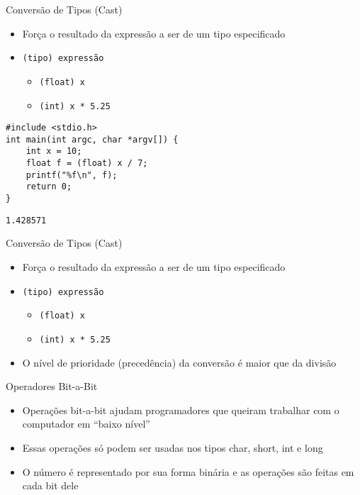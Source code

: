 \documentclass[t, aspectratio=169]{beamer}
\begin{document}
\begin{frame}[label={sec:org2662217},fragile]{Conversão de Tipos (Cast)}
 \begin{itemize}
\item Força o resultado da expressão a ser de um tipo especificado
\item \texttt{(tipo) expressão}
\begin{itemize}
\item \texttt{(float) x}
\item \texttt{(int) x * 5.25}
\end{itemize}
\end{itemize}

\vspace{-0.25cm}
\begin{verbatim}
#include <stdio.h>
int main(int argc, char *argv[]) {
    int x = 10;
    float f = (float) x / 7;
    printf("%f\n", f);
    return 0;
}
\end{verbatim}

\begin{verbatim}
1.428571
\end{verbatim}
\end{frame}

\begin{frame}[label={sec:org1d94ea9},fragile]{Conversão de Tipos (Cast)}
 \begin{itemize}
\item Força o resultado da expressão a ser de um tipo especificado
\item \texttt{(tipo) expressão}
\begin{itemize}
\item \texttt{(float) x}
\item \texttt{(int) x * 5.25}
\end{itemize}
\item O nível de prioridade (precedência) da conversão é maior que da divisão
\end{itemize}
\end{frame}

\begin{frame}[label={sec:org6eee1aa}]{Operadores Bit-a-Bit}
\begin{itemize}
\item Operações bit-a-bit ajudam programadores que queiram trabalhar com o
computador em ``baixo nível''
\item Essas operações só podem ser usadas nos tipos char, short, int e long
\item O número é representado por sua forma binária e as operações são
feitas em cada bit dele
\end{itemize}
\end{frame}
\end{document}

